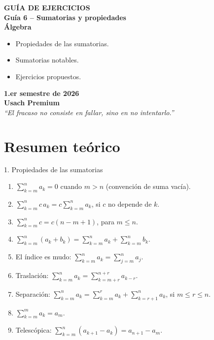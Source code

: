 \documentclass[letterpaper,12pt,twoside]{article}
\begin{document}

\begin{center}
\color{azulFuerte}
{\huge\bfseries GUÍA DE EJERCICIOS}\\[5mm]
{\Large\bfseries Guía 6 -- Sumatorias y propiedades}\\[5mm]
{\Huge\bfseries Álgebra}\\[13mm]
\begin{tcolorbox}[colback=celesteSuave,colframe=azulFuerte,arc=10pt,
  width=0.85\textwidth,boxrule=1.5pt]
\par\medskip
\color{black}
\begin{itemize}[leftmargin=2.6cm]
  \item[$\color{azulFuerte}\Rightarrow$] Propiedades de las sumatorias.
  \item[$\color{azulFuerte}\Rightarrow$] Sumatorias notables.
  \item[$\color{azulFuerte}\Rightarrow$] Ejercicios propuestos.
\end{itemize}
\end{tcolorbox}
\vfill
{\Large\bfseries 1.er semestre de 2026}\\[10mm]
{\large\bfseries Usach Premium}\\[12mm]
\textit{``El fracaso no consiste en fallar, sino en no intentarlo.''}
\end{center}

\newpage
{}
\section*{Resumen teórico}

\begin{theorybox}{1. Propiedades de las sumatorias}
\begin{enumerate}[label=\arabic*.,itemsep=0.55em]
  \item $\displaystyle \sum_{k=m}^{n}a_k=0$ cuando $m>n$ (convención de suma vacía).
  \item $\displaystyle \sum_{k=m}^{n}c\,a_k=c\sum_{k=m}^{n}a_k$, si $c$ no depende de $k$.
  \item $\displaystyle \sum_{k=m}^{n}c=c(n-m+1)$, para $m\le n$.
  \item $\displaystyle \sum_{k=m}^{n}(a_k+b_k)=\sum_{k=m}^{n}a_k+\sum_{k=m}^{n}b_k$.
  \item El índice es mudo: $\displaystyle \sum_{k=m}^{n}a_k=\sum_{j=m}^{n}a_j$.
  \item Traslación: $\displaystyle \sum_{k=m}^{n}a_k=\sum_{k=m+r}^{n+r}a_{k-r}$.
  \item Separación: $\displaystyle \sum_{k=m}^{n}a_k=\sum_{k=m}^{r}a_k+\sum_{k=r+1}^{n}a_k$, si $m\le r\le n$.
  \item $\displaystyle \sum_{k=m}^{m}a_k=a_m$.
  \item Telescópica: $\displaystyle \sum_{k=m}^{n}(a_{k+1}-a_k)=a_{n+1}-a_m$.
\end{enumerate}
\end{theorybox}
\end{document}
